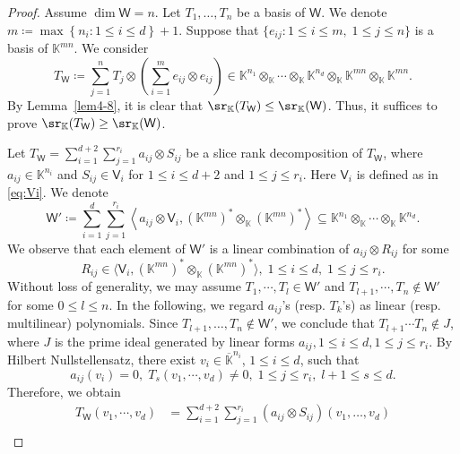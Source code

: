 \begin{proof} 
Assume $\dim \mathsf{W} = n$.  Let $T_1,\dots,  T_n$ be a basis of $\mathsf{W}$.  We denote $m \coloneqq \max \left\lbrace n_i: 1 \le i \le d \right\rbrace+1$.  Suppose that $\{e_{ij}: 1 \le i \le m,\; 1 \le j \le n \}$ is a basis of $\mathbb{K}^{mn}$.  We consider
\[
T_{\mathsf{W}} \coloneqq \sum_{j=1}^{n} T_{j}\otimes  \left( \sum_{i=1}^{m}  e_{ij} \otimes e_{ij} \right) \in \mathbb{K}^{n_1} \otimes_{\mathbb{K}}   \cdots \otimes_{\mathbb{K}}  \mathbb{K}^{n_d} \otimes_{\mathbb{K}}  \mathbb{K}^{mn} \otimes_{\mathbb{K}}  \mathbb{K}^{mn}. 
\]
By Lemma~\ref{lem4-8},  it is clear that $\sr_{\mathbb{K}}(T_{\mathsf{W}}) \le \sr_{\mathbb{K}}(\mathsf{W})$.  Thus, it suffices to prove $\sr_{\mathbb{K}}(T_{\mathsf{W}}) \ge \sr_{\mathbb{K}}(\mathsf{W})$. 

Let $T_{\mathsf{W}}=\sum_{i=1}^{d+2}\sum_{j=1}^{r_i} a_{ij}\otimes S_{ij}$ be a slice rank decomposition of $T_{\mathsf{W}}$,  where $a_{ij} \in \mathbb{K}^{n_i}$ and $S_{ij} \in \mathsf{V}_i$ for $1 \le i \le d+2$ and $1\le j \le r_i$.  Here $\mathsf{V}_i$ is defined as in \eqref{eq:Vi}.  We denote 
\[
\mathsf{W}' \coloneqq \sum_{i=1}^{d }\sum_{j=1}^{r_i}  \left\langle a_{ij}\otimes \mathsf{V}_i,  (\mathbb{K}^{mn})^\ast \otimes_{\mathbb{K}}  (\mathbb{K}^{mn})^\ast \right\rangle \subseteq \mathbb{K}^{n_1} \otimes_{\mathbb{K}}  \cdots \otimes_{\mathbb{K}}  \mathbb{K}^{n_d}.
\]
%
%
%
%
We observe that each element of $\mathsf{W}'$ is a linear combination of $a_{ij} \otimes R_{ij}$ for some 
\[
R_{ij} \in \langle \mathsf{V}_{i},  (\mathbb{K}^{mn})^\ast \otimes_{\mathbb{K}}  (\mathbb{K}^{mn})^\ast \rangle, \; 1\le i \le d,\; 1 \le j \le r_i.
\]
Without loss of generality,  we may assume $T_{1},\cdots, T_{l}\in \mathsf{W}'$ and $T_{l+1},\cdots,T_{n}\notin \mathsf{W}'$ for some $0 \le l \le n$. 
In the following,  we regard $a_{ij}$'s (resp.  $T_k$'s) as linear (resp.  multilinear) polynomials.  Since $T_{l+1}, \dots,  T_{n} \not\in \mathsf{W}'$,  we conclude that $T_{l+1}\cdots T_{n}  \notin J$, where $J$ is the prime ideal generated by  linear forms $a_{ij},  1\le i \le d,  1 \le j \le r_i$.  By Hilbert Nullstellensatz,  there exist $v_i\in \overline{\mathbb{K}}^{n_i}$,  $1\le i\le d$, such that 
\[
a_{ij}(v_{i})=0,\; T_{s}(v_{1},\cdots,v_{d})\not=0,\;1\le j\le r_{i},\; l+1\le s\le d.
\]
Therefore,  we obtain 
\begin{align}
T_{\mathsf{W}}(v_{1},\cdots,v_{d})&=\sum_{i=1}^{d+2}\sum_{j=1}^{r_{i}} (a_{ij} \otimes S_{ij})( v_1,\dots, v_{d} ) \nonumber \\

\end{align}
\end{proof}
